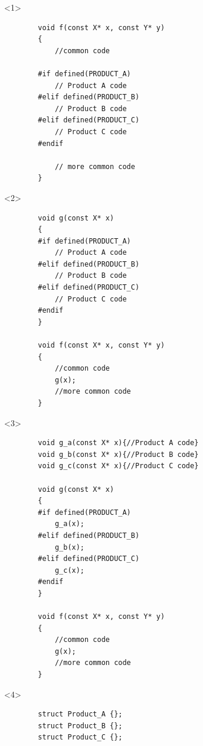 \documentclass{beamer}
\begin{document}
\begin{frame}[fragile,t]
    \begin{onlyenv}<1>
    \begin{lstlisting}
        void f(const X* x, const Y* y)
        {
            //common code

        #if defined(PRODUCT_A)
            // Product A code
        #elif defined(PRODUCT_B)
            // Product B code
        #elif defined(PRODUCT_C)
            // Product C code
        #endif

            // more common code
        }
    \end{lstlisting}
    \end{onlyenv}

    \begin{onlyenv}<2>
    \begin{lstlisting}
        void g(const X* x)
        {
        #if defined(PRODUCT_A)
            // Product A code
        #elif defined(PRODUCT_B)
            // Product B code
        #elif defined(PRODUCT_C)
            // Product C code
        #endif
        }

        void f(const X* x, const Y* y)
        {
            //common code
            g(x);
            //more common code
        }
    \end{lstlisting}
    \end{onlyenv}

    \begin{onlyenv}<3>
    \begin{lstlisting}
        void g_a(const X* x){//Product A code}
        void g_b(const X* x){//Product B code}
        void g_c(const X* x){//Product C code}
        
        void g(const X* x)
        {
        #if defined(PRODUCT_A)
            g_a(x);
        #elif defined(PRODUCT_B)
            g_b(x);
        #elif defined(PRODUCT_C)
            g_c(x);
        #endif
        }

        void f(const X* x, const Y* y)
        {
            //common code
            g(x);
            //more common code
        }

    \end{lstlisting}
    \end{onlyenv}
    
    \begin{onlyenv}<4>
    \begin{lstlisting}
        struct Product_A {};
        struct Product_B {};
        struct Product_C {};


\end{lstlisting}
\end{onlyenv}
\end{frame}
\end{document}
